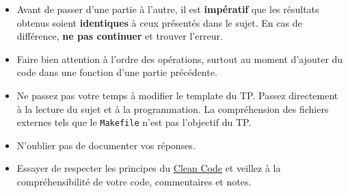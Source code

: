 \begin{itemize}
\item Avant de passer d'une partie à l'autre, il est \textbf{impératif} que les résultats obtenus soient \textbf{identiques} à ceux présentés dans le sujet. En cas de différence, \textbf{ne pas continuer} et trouver l'erreur.
\item Faire bien attention à l'ordre des opérations, surtout au moment d'ajouter du code dans une fonction d'une partie précédente.
\item Ne passez pas votre temps à modifier le template du TP. Passez directement à la lecture du sujet et à la programmation. La compréhension des fichiers externes tels que le \texttt{Makefile} n'est pas l'objectif du TP.
\item
  N'oublier pas de documenter vos réponses.
\item
  Essayer de respecter les principes du \href{https://github.com/JuanCrg90/Clean-Code-Notes}{Clean Code} et veillez à la compréhensibilité de votre code, commentaires et notes.
\end{itemize}
